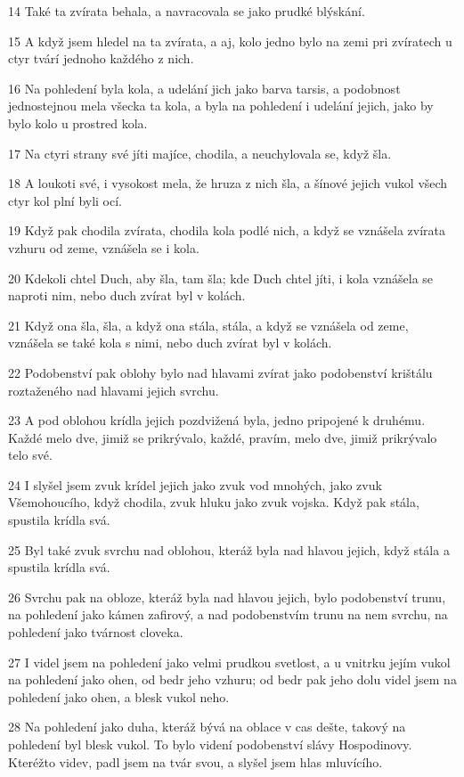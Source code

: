 \par 14 Také ta zvírata behala, a navracovala se jako prudké blýskání.
\par 15 A když jsem hledel na ta zvírata, a aj, kolo jedno bylo na zemi pri zvíratech u ctyr tvárí jednoho každého z nich.
\par 16 Na pohledení byla kola, a udelání jich jako barva tarsis, a podobnost jednostejnou mela všecka ta kola, a byla na pohledení i udelání jejich, jako by bylo kolo u prostred kola.
\par 17 Na ctyri strany své jíti majíce, chodila, a neuchylovala se, když šla.
\par 18 A loukoti své, i vysokost mela, že hruza z nich šla, a šínové jejich vukol všech ctyr kol plní byli ocí.
\par 19 Když pak chodila zvírata, chodila kola podlé nich, a když se vznášela zvírata vzhuru od zeme, vznášela se i kola.
\par 20 Kdekoli chtel Duch, aby šla, tam šla; kde Duch chtel jíti, i kola vznášela se naproti nim, nebo duch zvírat byl v kolách.
\par 21 Když ona šla, šla, a když ona stála, stála, a když se vznášela od zeme, vznášela se také kola s nimi, nebo duch zvírat byl v kolách.
\par 22 Podobenství pak oblohy bylo nad hlavami zvírat jako podobenství krištálu roztaženého nad hlavami jejich svrchu.
\par 23 A pod oblohou krídla jejich pozdvižená byla, jedno pripojené k druhému. Každé melo dve, jimiž se prikrývalo, každé, pravím, melo dve, jimiž prikrývalo telo své.
\par 24 I slyšel jsem zvuk krídel jejich jako zvuk vod mnohých, jako zvuk Všemohoucího, když chodila, zvuk hluku jako zvuk vojska. Když pak stála, spustila krídla svá.
\par 25 Byl také zvuk svrchu nad oblohou, kteráž byla nad hlavou jejich, když stála a spustila krídla svá.
\par 26 Svrchu pak na obloze, kteráž byla nad hlavou jejich, bylo podobenství trunu, na pohledení jako kámen zafirový, a nad podobenstvím trunu na nem svrchu, na pohledení jako tvárnost cloveka.
\par 27 I videl jsem na pohledení jako velmi prudkou svetlost, a u vnitrku jejím vukol na pohledení jako ohen, od bedr jeho vzhuru; od bedr pak jeho dolu videl jsem na pohledení jako ohen, a blesk vukol neho.
\par 28 Na pohledení jako duha, kteráž bývá na oblace v cas dešte, takový na pohledení byl blesk vukol. To bylo videní podobenství slávy Hospodinovy. Kteréžto videv, padl jsem na tvár svou, a slyšel jsem hlas mluvícího.

